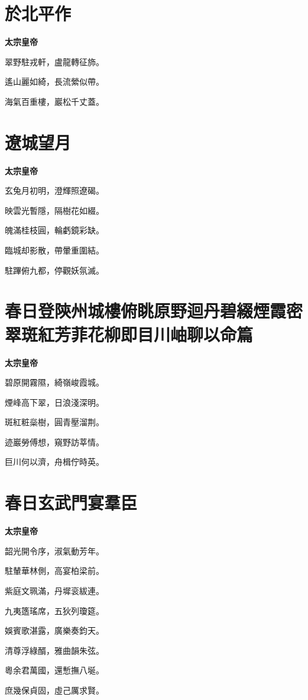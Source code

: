 \documentclass[12pt,a4paper]{ctexbook}
\begin{document}
\section{於北平作}
\textbf{太宗皇帝}\par\vspace{0.5em}
翠野駐戎軒，盧龍轉征斾。\par
遙山麗如綺，長流縈似帶。\par
海氣百重樓，巖松千丈蓋。\par

\section{遼城望月}
\textbf{太宗皇帝}\par\vspace{0.5em}
玄兔月初明，澄輝照遼碣。\par
映雲光暫隱，隔樹花如綴。\par
魄滿桂枝圓，輪虧鏡彩缺。\par
臨城却影散，帶暈重圍結。\par
駐蹕俯九都，停觀妖氛滅。\par

\section{春日登陝州城樓俯眺原野迴丹碧綴煙霞密翠斑紅芳菲花柳即目川岫聊以命篇}
\textbf{太宗皇帝}\par\vspace{0.5em}
碧原開霧隰，綺嶺峻霞城。\par
煙峰高下翠，日浪淺深明。\par
斑紅粧橤樹，圓青壓溜荆。\par
迹巖勞傅想，窺野訪莘情。\par
巨川何以濟，舟楫佇時英。\par

\section{春日玄武門宴羣臣}
\textbf{太宗皇帝}\par\vspace{0.5em}
韶光開令序，淑氣動芳年。\par
駐輦華林側，高宴柏梁前。\par
紫庭文珮滿，丹墀衮紱連。\par
九夷簉瑤席，五狄列瓊筵。\par
娛賓歌湛露，廣樂奏鈞天。\par
清尊浮綠醑，雅曲韻朱弦。\par
粵余君萬國，還慙撫八埏。\par
庶幾保貞固，虛己厲求賢。\par
\end{document}
